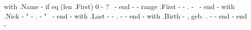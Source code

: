 {{ with .Name -}}
    {{ if eq (len .First) 0 -}}
        ?~
    {{- end -}}
    {{- range .First -}}
        {{- . -}}~
    {{- end -}}
    {{ with .Nick -}}
        " {{- . -}} "~
    {{- end -}}
    {{ with .Last -}}
        {{- . -}}
    {{- end -}}
    {{ with .Birth -}}
        , geb. {{ . -}}
    {{- end -}}
{{ end -}}